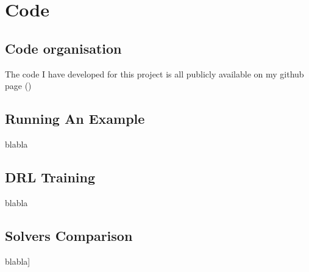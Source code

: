 
\chapter{Code} %

\label{Chapter3} %


\section{Code organisation}

The code I have developed for this project is all publicly available on my github page (\cite{FB})

\section{Running An Example}

blabla


\section{DRL Training}

blabla


\section{Solvers Comparison}

blabla]